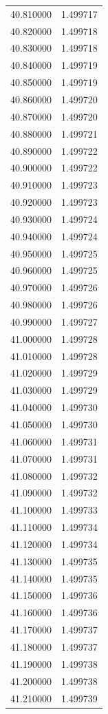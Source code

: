 \begin{tabular}{rr}
40.810000 & 1.499717 \\
40.820000 & 1.499718 \\
40.830000 & 1.499718 \\
40.840000 & 1.499719 \\
40.850000 & 1.499719 \\
40.860000 & 1.499720 \\
40.870000 & 1.499720 \\
40.880000 & 1.499721 \\
40.890000 & 1.499722 \\
40.900000 & 1.499722 \\
40.910000 & 1.499723 \\
40.920000 & 1.499723 \\
40.930000 & 1.499724 \\
40.940000 & 1.499724 \\
40.950000 & 1.499725 \\
40.960000 & 1.499725 \\
40.970000 & 1.499726 \\
40.980000 & 1.499726 \\
40.990000 & 1.499727 \\
41.000000 & 1.499728 \\
41.010000 & 1.499728 \\
41.020000 & 1.499729 \\
41.030000 & 1.499729 \\
41.040000 & 1.499730 \\
41.050000 & 1.499730 \\
41.060000 & 1.499731 \\
41.070000 & 1.499731 \\
41.080000 & 1.499732 \\
41.090000 & 1.499732 \\
41.100000 & 1.499733 \\
41.110000 & 1.499734 \\
41.120000 & 1.499734 \\
41.130000 & 1.499735 \\
41.140000 & 1.499735 \\
41.150000 & 1.499736 \\
41.160000 & 1.499736 \\
41.170000 & 1.499737 \\
41.180000 & 1.499737 \\
41.190000 & 1.499738 \\
41.200000 & 1.499738 \\
41.210000 & 1.499739 \\

\end{tabular}
